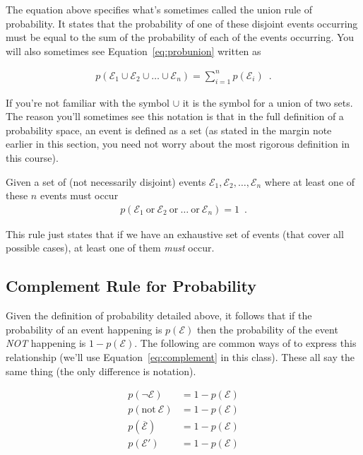 \documentclass[assignment01_Solutions]{subfiles}
\begin{document}
The equation above specifies what's sometimes called the union rule of probability.  It states that the probability of one of these disjoint events occurring must be equal to the sum of the probability of each of the events occurring.  You will also sometimes see Equation~\ref{eq:probunion} written as

\begin{align}
p(\mathcal{E}_1 \cup \mathcal{E}_2 \cup \ldots \cup \mathcal{E}_n) = \sum_{i=1}^n p(\mathcal{E}_i) \enspace .
\end{align}

If you're not familiar with the symbol $\cup$ it is the symbol for a union of two sets.  The reason you'll sometimes see this notation is that in the full definition of a probability space, an event is defined as a set (as stated in the margin note earlier in this section, you need not worry about the most rigorous definition in this course).

\item Given a set of (not necessarily disjoint) events $\mathcal{E}_1, \mathcal{E}_2, \ldots, \mathcal{E}_n$ where at least one of these $n$ events must occur
\begin{align}
p(\mathcal{E}_1~\mbox{or}~\mathcal{E}_2~\mbox{or}~\ldots~\mbox{or}~\mathcal{E}_n) = 1 \enspace .
\end{align}
\ei

This rule just states that if we have an exhaustive set of events (that cover all possible cases), at least one of them \emph{must} occur.

\subsection{Complement Rule for Probability}

Given the definition of probability detailed above, it follows that if the probability of an event happening is $p(\mathcal{E})$ then the probability of the event \emph{NOT} happening is $1-p(\mathcal{E})$.   The following are common ways of to express this relationship (we'll use Equation~\ref{eq:complement} in this class).  These all say the same thing (the only difference is notation).

\begin{align}
p(\neg \mathcal{E}) &= 1 - p(\mathcal{E}) \label{eq:complement} \\
p(\mbox{not}~\mathcal{E}) &= 1 - p(\mathcal{E}) \nonumber \\
p(\overline{\mathcal{E}}) &= 1 - p(\mathcal{E}) \nonumber \\
p(\mathcal{E}') &= 1 - p(\mathcal{E}) \nonumber
\end{align}
\end{document}
